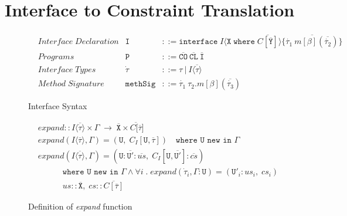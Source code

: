 \section{Interface to Constraint Translation}\label{appendix:intertrans}

\begin{figure}[H]
    \centering
    \begin{align*}
        &Interface \; Declaration & \texttt{I} &::= \texttt{interface} \; I\langle{\texttt{X}} \; \texttt{where} \; \overline{C[\overline{\texttt{Y}}]}\rangle \{ \overline{\Dot{\tau_1} \: m[\beta](\overline{\Dot{\tau_2}})} \} \\
        &Programs & \texttt{P} &::= \overline{\texttt{CO}} \: \overline{\texttt{CL}} \: \overline{\texttt{I}} \\
        &Interface \; Types & \Dot{\tau} &::= \tau \: | \: I\langle\overline{\Dot{\tau}}\rangle \\
        &Method \; Signature & \texttt{methSig} &::= \Dot{\tau_1} \: \tau_2.m[\beta](\overline{\Dot{\tau_3}})
    \end{align*}
    \caption{Interface Syntax}
    \label{fig:interface-syntax}
\end{figure}

\begin{figure}[H]
    \centering
    \begin{align*}
       &expand :: I\langle\overline{\Dot{\tau}}\rangle \times \Gamma \; \to \; \overline{\texttt{X}} \times \overline{C[\overline{\tau}}] \\
       &expand(I\langle\overline{\tau}\rangle, \Gamma) = (\texttt{U}, \; C_I[\texttt{U}, \overline{\tau}]) \quad \texttt{where U new in } \Gamma  \\
       &expand(I\langle\overline{\Dot{\tau}}\rangle, \Gamma) = (\texttt{U}:\overline{\texttt{U}'}:\overline{us}, \; C_I[\texttt{U},  \overline{\texttt{U}'}]:\overline{cs}) \\
       &\quad\quad\quad \texttt{where U new in } \Gamma \land \forall i \; . \; expand(\Dot{\tau}_i, \Gamma:\texttt{U}) = (\texttt{U}'_i:us_i, \; cs_i) \\
       &\quad\quad\quad us :: \overline{\texttt{X}}, \; cs :: \overline{C[\overline{\tau}]}
    \end{align*}
    \caption{Definition of \textit{expand} function}
    \label{fig:interface-expand}
\end{figure}

